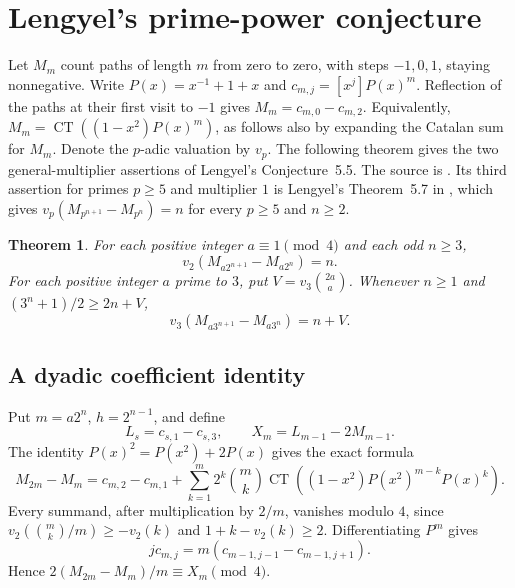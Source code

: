 \documentclass[11pt,a4paper]{article}
\newtheorem{theorem}{Theorem}[section]
\begin{document}
\section{Lengyel's prime-power conjecture}

Let $M_m$ count paths of length $m$ from zero to zero, with steps $-1,0,1$, staying nonnegative. Write $P(x)=x^{-1}+1+x$ and $c_{m,j}=[x^j]P(x)^m$.
Reflection of the paths at their first visit to $-1$ gives
$M_m=c_{m,0}-c_{m,2}$. Equivalently,
$M_m=\operatorname{CT}((1-x^2)P(x)^m)$, as follows also
by expanding the Catalan sum for $M_m$.
Denote the $p$-adic valuation by $v_p$. The following theorem gives
the two general-multiplier assertions of Lengyel's Conjecture~5.5.
The source is \cite[Conj.~5.5]{len13}. Its third assertion for primes $p\ge5$ and multiplier $1$ is
Lengyel's Theorem~5.7 in \cite{len13}, which gives $v_p(M_{p^{n+1}}-M_{p^n})=n$ for every $p\ge5$ and $n\ge2$.

\begin{theorem}\label{thm:lengyel55}
For each positive integer $a\equiv1\pmod4$ and each odd $n\ge3$,
\[
 v_2(M_{a2^{n+1}}-M_{a2^n})=n .
\]
For each positive integer $a$ prime to $3$, put
$V=v_3\binom{2a}{a}$. Whenever $n\ge1$ and
$(3^n+1)/2\ge 2n+V$,
\[
 v_3(M_{a3^{n+1}}-M_{a3^n})=n+V .
\]
\end{theorem}

\subsection{A dyadic coefficient identity}

Put $m=a2^n$, $h=2^{n-1}$, and define
\[
 L_s=c_{s,1}-c_{s,3},\qquad X_m=L_{m-1}-2M_{m-1}.
\]
The identity $P(x)^2=P(x^2)+2P(x)$ gives the exact formula
\[
 M_{2m}-M_m=c_{m,2}-c_{m,1}
 +\sum_{k=1}^m 2^k\binom{m}{k}
 \operatorname{CT}\!\left((1-x^2)P(x^2)^{m-k}P(x)^k\right).
\]
Every summand, after multiplication by $2/m$, vanishes modulo $4$,
since $v_2(\binom{m}{k}/m)\ge-v_2(k)$ and
$1+k-v_2(k)\ge2$. Differentiating $P^m$ gives
\[
 j c_{m,j}=m(c_{m-1,j-1}-c_{m-1,j+1}).
\]
Hence $2(M_{2m}-M_m)/m\equiv X_m\pmod4$.
\end{document}
